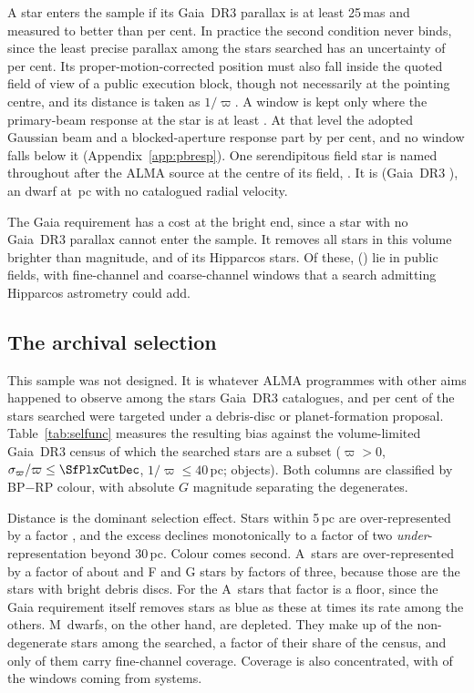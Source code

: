 A star enters the sample if its Gaia~DR3 parallax is at least 25\,mas and
measured to better than \PlxAdqlPct{} per cent. In practice the second
condition never binds, since the least precise parallax among the stars
searched has an uncertainty of \SfPlxWorstPct{} per cent.
Its proper-motion-corrected position must also fall inside the quoted field
of view of a public execution block, though not necessarily at the pointing
centre, and its distance is taken as $1/\varpi$. A window is kept only where
the primary-beam response at the star is at least \BmFloorResp. At that level
the adopted Gaussian beam and a blocked-aperture response part by
\BmFloorTolPct{} per cent, and no window falls below it
(Appendix~\ref{app:pbresp}). One serendipitous field star is named throughout
after the ALMA source at the centre of its field, \BkAlmaName. It is
\BkAlmaTwoMass{} (Gaia~DR3 \BkAlmaGaia), an \BkAlmaSpType{} dwarf at
\BkAlmaDistPc\,pc with no catalogued radial velocity.

The Gaia requirement has a cost at the bright end, since a star with no
Gaia~DR3 parallax cannot enter the sample. It removes all \BsNBright{} stars
in this volume brighter than \BsBrightMag{} magnitude, and \BsNGap{} of its
\BsNVol{} Hipparcos stars. Of these, \BsNAlmaWord{} (\BsStarList) lie in
public fields, with \BsNWinA{} fine-channel and \BsNWinB{} coarse-channel
windows that a search admitting Hipparcos astrometry could add.


\subsection{The archival selection}
\label{sec:bias}

This sample was not designed. It is whatever ALMA programmes with other aims
happened to observe among the stars Gaia~DR3 catalogues, and
\PctDiscProposal{} per cent of the stars searched were targeted under a
debris-disc or planet-formation proposal. Table~\ref{tab:selfunc} measures the
resulting bias against the volume-limited Gaia~DR3 census of which the
searched stars are a subset ($\varpi>0$, $\sigma_\varpi/\varpi\le\SfPlxCutDec$,
$1/\varpi\le40$\,pc; \SfCensusN{} objects). Both columns are classified by
BP$-$RP colour, with absolute $G$ magnitude separating the degenerates.

Distance is the dominant selection effect. Stars within 5\,pc are
over-represented by a factor \SfTopRatio, and the excess declines
monotonically to a factor of two \emph{under}-representation beyond 30\,pc. Colour comes
second. A~stars are over-represented by a factor of about \SfARatio{} and F and G stars
by factors of three, because those are the stars with bright debris discs.
For the A~stars that factor is a floor, since the Gaia requirement
itself removes stars as blue as these at \BsEarlyRatio{} times its rate among
the others. M~dwarfs, on the other hand, are depleted. They make up
\SfMSearched{} of the \SfNMain{} non-degenerate stars among the \SfNStar{}
searched, a factor \SfMRatio{} of their share of the census, and only
\SfMClassAStars{} of them carry fine-channel coverage. Coverage is also concentrated, with
\ConcThreeWin{} of the \NWindows{} windows coming from \ConcThreeSys{}
systems.

